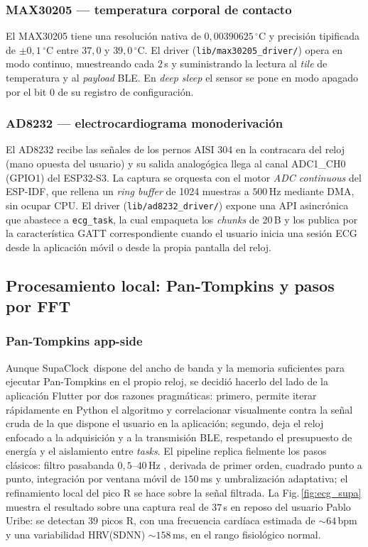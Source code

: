 \documentclass[letterpaper,11pt]{article}
\newcommand{\rfigura}[1]{Fig.\,\ref{#1}}
\newcommand{\NombreProyecto}{SupaClock}
\begin{document}
\subsubsection*{MAX30205 --- temperatura corporal de contacto}
El MAX30205 \cite{max30205_ds} tiene una resoluci\'on nativa de $0{,}00390625\,^\circ$C y precisi\'on tipificada de $\pm 0{,}1\,^\circ$C entre $37{,}0$ y $39{,}0\,^\circ$C. El driver (\texttt{lib/max30205\_driver/}) opera en modo continuo, muestreando cada $2$\,s y suministrando la lectura al \textit{tile} de temperatura y al \textit{payload} BLE. En \textit{deep sleep} el sensor se pone en modo apagado por el bit 0 de su registro de configuraci\'on.

\subsubsection*{AD8232 --- electrocardiograma monoderivaci\'on}
El AD8232 \cite{ad8232_ds} recibe las se\~nales de los pernos AISI 304 en la contracara del reloj (mano opuesta del usuario) y su salida analog\'ogica llega al canal ADC1\_CH0 (GPIO1) del ESP32-S3. La captura se orquesta con el motor \textit{ADC continuous} del ESP-IDF, que rellena un \textit{ring buffer} de 1024 muestras a $500$\,Hz mediante DMA, sin ocupar CPU. El driver (\texttt{lib/ad8232\_driver/}) expone una API asincr\'onica que abastece a \texttt{ecg\_task}, la cual empaqueta los \textit{chunks} de 20\,B y los publica por la caracter\'istica GATT correspondiente cuando el usuario inicia una sesi\'on ECG desde la aplicaci\'on m\'ovil o desde la propia pantalla del reloj.

\subsection{Procesamiento local: Pan-Tompkins y pasos por FFT}

\subsubsection*{Pan-Tompkins app-side}
Aunque \NombreProyecto\ dispone del ancho de banda y la memoria suficientes para ejecutar Pan-Tompkins \cite{pan_tompkins} en el propio reloj, se decidi\'o hacerlo del lado de la aplicaci\'on Flutter por dos razones pragm\'aticas: primero, permite iterar r\'apidamente en Python el algoritmo y correlacionar visualmente contra la se\~nal cruda de la que dispone el usuario en la aplicaci\'on; segundo, deja el reloj enfocado a la adquisici\'on y a la transmisi\'on BLE, respetando el presupuesto de energ\'ia y el aislamiento entre \textit{tasks}. El pipeline replica fielmente los pasos cl\'asicos: filtro pasabanda $0{,}5$--$40$\,Hz \cite{ieee11073}, derivada de primer orden, cuadrado punto a punto, integraci\'on por ventana m\'ovil de $150$\,ms y umbralizaci\'on adaptativa; el refinamiento local del pico R se hace sobre la se\~nal filtrada. La \rfigura{fig:ecg_supa} muestra el resultado sobre una captura real de $37$\,s en reposo del usuario Pablo Uribe: se detectan $39$ picos R, con una frecuencia card\'iaca estimada de $\sim 64$\,bpm y una variabilidad HRV(SDNN) $\sim 158$\,ms, en el rango fisiol\'ogico normal.
\end{document}
